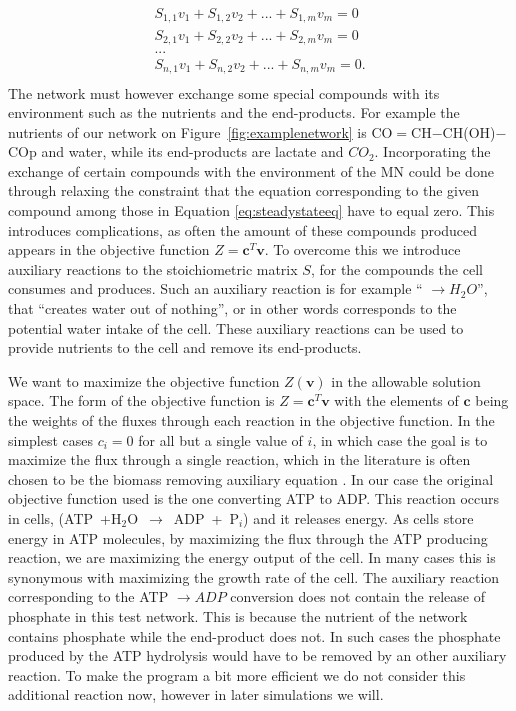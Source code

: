 \documentclass[a4paper,12pt]{article}
\begin{document}
	\begin{equation}\label{eq:steadystateeq}
		\begin{matrix}
			S_{1,1} v_1 + S_{1,2} v_2 + ... + S_{1,m} v_m=0 \\
			S_{2,1} v_1 + S_{2,2} v_2 + ... + S_{2,m} v_m=0 \\
			... \\
			S_{n,1} v_1 + S_{n,2} v_2 + ... + S_{n,m} v_m=0 .\\
		\end{matrix}
	\end{equation}
	The network must however exchange some special compounds with its environment such as the nutrients and the end-products. For example the nutrients of our network on Figure~\ref{fig:examplenetwork} is CO$=$CH$-$CH(OH)$-$COp and water, while its end-products are lactate and $CO_2$. Incorporating the exchange of certain compounds with the environment of the MN could be done through relaxing the constraint that the equation corresponding to the given compound among those in Equation \ref{eq:steadystateeq} have to equal zero. This introduces complications, as often the amount of these compounds produced appears in the objective function $Z=\mathbf{c}^T \mathbf{v}$. To overcome this we introduce auxiliary reactions to the stoichiometric matrix $S$, for the compounds the cell consumes and produces. Such an auxiliary reaction is for example `` $ \rightarrow H_2O$'', that ``creates water out of nothing'', or in other words corresponds to the potential water intake of the cell. These auxiliary reactions can be used to provide nutrients to the cell and remove its end-products.%


	We want to maximize the objective function $Z \left( \mathbf{v} \right)$ in the allowable solution space.  The form of the objective function is $Z=\mathbf{c}^T \mathbf{v}$ with the elements of $\mathbf{c}$ being the weights of the fluxes through each reaction in the objective function. In the simplest cases $c_i=0$ for all but a single value of $i$, in which case the goal is to maximize the flux through a single reaction, which in the literature is often chosen to be the biomass removing auxiliary equation \cite{whatisfluxbalance}. In our case the original objective function used is the one converting ATP to ADP. This reaction occurs in cells, (ATP~+H$_2$O~$\rightarrow$~ADP~+~P$_i$) and it releases energy. As cells store energy in ATP molecules, by maximizing the flux through the ATP producing reaction, we are maximizing the energy output of the cell. In many cases this is synonymous with maximizing the growth rate of the cell. The auxiliary reaction corresponding to the ATP $\rightarrow ADP$ conversion does not contain the release of phosphate in this test network. This is because the nutrient of the network contains phosphate while the end-product does not. In such cases the phosphate produced by the ATP hydrolysis would have to be removed by an other auxiliary reaction. To make the program a bit more efficient we do not consider this additional reaction now, however in later simulations we will. 
\end{document}
